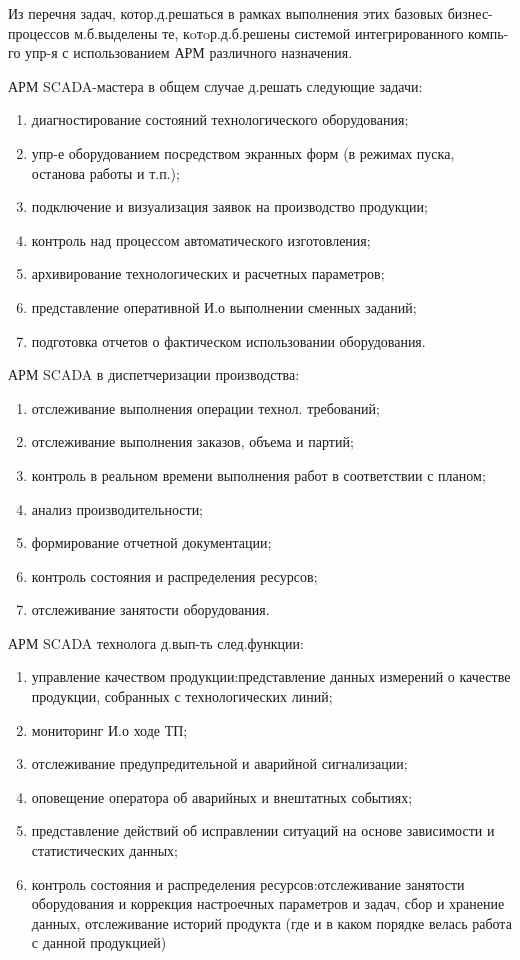 \documentclass[unicode, 12pt, a4paper, oneside]{article}
\begin{document}
Из перечня задач, котор.д.решаться в рамках выполнения этих базовых бизнес-процессов м.б.выделены те, кoтoр.д.б.решены системой интегрированного компь-го упр-я с использованием АРМ различного назначения.

АРМ SCADA-мастера в общем случае д.решать следующие задачи:
\begin{enumerate}
\item диагностирование состояний технологического оборудования;
\item упр-е оборудованием посредством экранных форм (в режимах пуска, останова работы и т.п.);
\item подключение и визуализация заявок на производство продукции;
\item контроль над процессом автоматического изготовления;
\item архивирование технологических и расчетных параметров;
\item представление оперативной И.о выполнении сменных заданий;
\item подготовка отчетов о фактическом использовании оборудования.
\end{enumerate}
АРМ SCADA в диспетчеризации производства:
\begin{enumerate}
\item	отслеживание выполнения операции технол. требований;
\item	отслеживание выполнения заказов, объема и партий;
\item	контроль в реальном времени выполнения работ в соответствии с планом;
\item	анализ производительности;
\item	формирование отчетной документации;
\item	контроль состояния и распределения ресурсов;
\item	отслеживание занятости оборудования.
\end{enumerate}
АРМ SCADA технолога д.вып-ть след.функции:
\begin{enumerate}
\item управление качеством продукции:представление данных измерений о качестве продукции, собранных с технологических линий;
\item мониторинг И.о ходе ТП;
\item отслеживание предупредительной и аварийной сигнализации;
\item оповещение оператора об аварийных и внештатных событиях;
\item представление действий об исправлении ситуаций на основе зависимости и статистических данных;
\item контроль состояния и распределения ресурсов:отслеживание занятости оборудования и коррекция настроечных параметров и задач, сбор и хранение данных, отслеживание историй продукта (где и в каком порядке велась работа с данной продукцией)
\end{enumerate}
\end{document}
